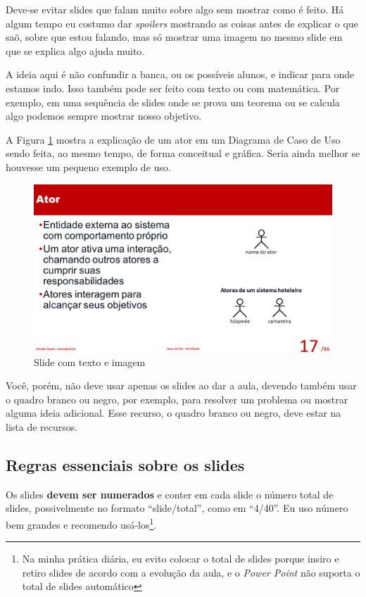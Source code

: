 \documentclass{article}
\def\tam{0.6}
\begin{document}
Deve-se evitar slides que falam muito sobre algo sem mostrar como é feito. Há algum tempo eu costumo dar \textit{spoilers} mostrando as coisas antes de explicar o que saõ, sobre que estou falando, mas só mostrar uma imagem no mesmo slide em que se explica algo ajuda muito. 

A ideia aqui é não confundir a banca, ou os possíveis alunos, e indicar para onde estamos indo. Isso também pode ser feito com texto ou com matemática. Por exemplo, em uma sequência de slides onde se prova um teorema ou se calcula algo podemos sempre mostrar nosso objetivo.

A Figura \ref{fig:teximag} mostra a explicação de um ator em um Diagrama de Caso de Uso sendo feita, ao mesmo tempo, de forma conceitual e gráfica. Seria ainda melhor se houvesse um pequeno exemplo de uso.

\begin{figure}[hbt]
    \centering
    \includegraphics[width=\tam\linewidth]{imagens/slidecomimage.png}
    \caption{Slide com texto e imagem}
    \label{fig:teximag}
\end{figure}

Você, porém, não deve usar apenas os slides ao dar a aula, devendo também usar o quadro branco ou negro, por exemplo, para resolver um problema ou mostrar alguma ideia adicional. Esse recurso, o quadro branco ou negro, deve estar na lista de recursos. 


\subsection{Regras essenciais sobre os slides}

Os slides \textbf{devem ser numerados} e conter em cada slide o número total de slides, possivelmente no formato ``slide/total'', como em ``4/40''. Eu uso número bem grandes e recomendo usá-los\footnote{Na minha prática diária, eu evito colocar o total de slides porque insiro e retiro slides de acordo com a evolução da aula, e o \textit{Power Point} não suporta o  total de slides automático}.
\end{document}
